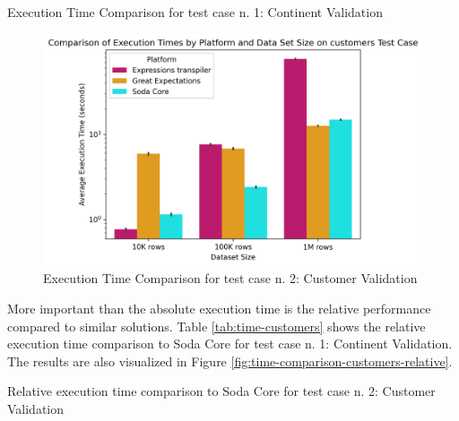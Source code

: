 \begin{table}[h] 
    \footnotesize
    \centering 
    \caption{Execution Time Comparison for test case n. 1: Continent Validation} 
    \label{tab:time-customers} 
    
\end{table}

\begin{figure}[htbp]
  \centering
  \includegraphics[width=1.0\columnwidth]{result-analysis/plots/execution_time_comparison_customers.png}
  \caption{Execution Time Comparison for test case n. 2: Customer Validation}
  \label{fig:time-comparison-customers}
\end{figure}


More important than the absolute execution time is the relative performance compared to similar solutions. Table \ref{tab:time-customers} shows the relative execution time comparison to Soda Core for test case n. 1: Continent Validation. The results are also visualized in Figure \ref{fig:time-comparison-customers-relative}.

\begin{table}[h] 
  \centering 
  \caption{Relative execution time comparison to Soda Core for test case n. 2: Customer Validation} 
  \label{tab:time-customers-relative} 
  
\end{table}


